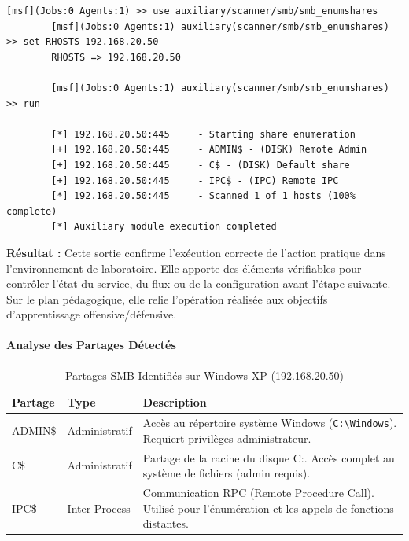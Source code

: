 \documentclass[12pt,a4paper,openany]{report}
\newcommand{\tableheadcolor}{\rowcolor{tableheadbg}}
\begin{document}
	\begin{lstlisting}[caption=Énumération Partages SMB via Metasploit]
		[msf](Jobs:0 Agents:1) >> use auxiliary/scanner/smb/smb_enumshares
		[msf](Jobs:0 Agents:1) auxiliary(scanner/smb/smb_enumshares) >> set RHOSTS 192.168.20.50
		RHOSTS => 192.168.20.50
		
		[msf](Jobs:0 Agents:1) auxiliary(scanner/smb/smb_enumshares) >> run
		
		[*] 192.168.20.50:445     - Starting share enumeration
		[+] 192.168.20.50:445     - ADMIN$ - (DISK) Remote Admin
		[+] 192.168.20.50:445     - C$ - (DISK) Default share
		[+] 192.168.20.50:445     - IPC$ - (IPC) Remote IPC
		[*] 192.168.20.50:445     - Scanned 1 of 1 hosts (100% complete)
		[*] Auxiliary module execution completed
	\end{lstlisting}
	
	\textbf{Résultat :} Cette sortie confirme l'exécution correcte de l'action pratique dans l'environnement de laboratoire. Elle apporte des éléments vérifiables pour contrôler l'état du service, du flux ou de la configuration avant l'étape suivante. Sur le plan pédagogique, elle relie l'opération réalisée aux objectifs d'apprentissage offensive/défensive.
	
	
	\paragraph{Analyse des Partages Détectés}
	
	\begin{table}[H]
		\centering
		\renewcommand{\arraystretch}{1.4}
		\setlength{\arrayrulewidth}{0.5pt}
		\begin{tabular}{>{\ttfamily}p{2.5cm} p{2.5cm} p{7.5cm}}
			\arrayrulecolor{tableborder}
			\hline
			\tableheadcolor
			\textcolor{tableheadfg}{\textbf{Partage}} &
			\textcolor{tableheadfg}{\textbf{Type}} &
			\textcolor{tableheadfg}{\textbf{Description}} \\
			\hline
			\rowcolor{tablerowalt}
			ADMIN\$ & Administratif & Accès au répertoire système Windows (\texttt{C:\textbackslash Windows}). Requiert privilèges administrateur. \\
			
			C\$ & Administratif & Partage de la racine du disque C:. Accès complet au système de fichiers (admin requis). \\
			
			\rowcolor{tablerowalt}
			IPC\$ & Inter-Process & Communication RPC (Remote Procedure Call). Utilisé pour l'énumération et les appels de fonctions distantes. \\
			\hline
		\end{tabular}
		\caption{Partages SMB Identifiés sur Windows XP (192.168.20.50)}
		\label{tab:smb-shares-identified}
	\end{table}
	
\end{document}

